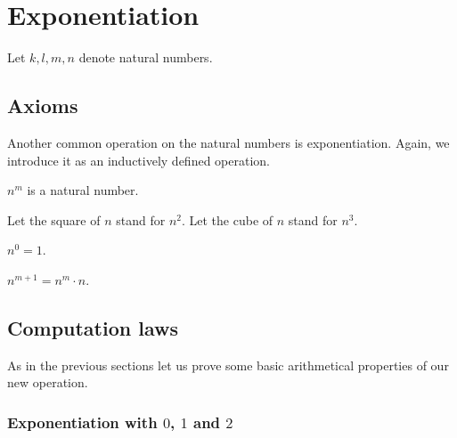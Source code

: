 \documentclass[../../arithmetic.tex]{subfiles}
\begin{document}
  \section{Exponentiation}

  \begin{forthel}
  \end{forthel}

  \begin{forthel}
    Let $k, l, m, n$ denote natural numbers.
  \end{forthel}


  \subsection{Axioms}

  Another common operation on the natural numbers is exponentiation.
  Again, we introduce it as an inductively defined operation.

  \begin{forthel}
    \begin{signature}
      $n^{m}$ is a natural number.
    \end{signature}

    Let the square of $n$ stand for $n^{2}$.
    Let the cube of $n$ stand for $n^{3}$.

    \begin{axiom}\label{Arithmetic_01_04_316593}
      $n^{0} = 1$.
    \end{axiom}

    \begin{axiom}\label{Arithmetic_01_04_312242}
      $n^{m + 1} = n^{m} \cdot n$.
    \end{axiom}
  \end{forthel}


  \subsection{Computation laws}

  As in the previous sections let us prove some basic arithmetical properties of
  our new operation.


  \subsubsection*{Exponentiation with $0$, $1$ and $2$}
\end{document}
